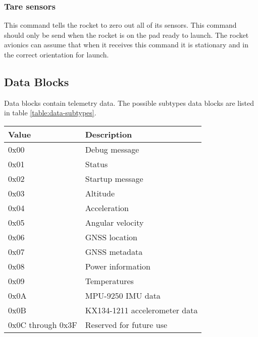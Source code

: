 \subsubsection{Tare sensors}
This command tells the rocket to zero out all of its sensors. This command should only be send when the rocket is on
the pad ready to launch. The rocket avionics can assume that when it receives this command it is stationary and in the
correct orientation for launch.

\subsection{Data Blocks}
Data blocks contain telemetry data. The possible subtypes data blocks are listed in table \ref{table:data-subtypes}.

\begin{table*}[htb]
    \centering
    \begin{tabular}{@{}ll@{}}
        \toprule
        Value             & Description                   \\
        \midrule
        0x00              & Debug message                 \\
        0x01              & Status                        \\
        0x02              & Startup message               \\
        0x03              & Altitude                      \\
        0x04              & Acceleration                  \\
        0x05              & Angular velocity              \\
        0x06              & GNSS location                 \\
        0x07              & GNSS metadata                 \\
        0x08              & Power information             \\
        0x09              & Temperatures                  \\
        0x0A              & MPU-9250 IMU data             \\
        0x0B              & KX134-1211 accelerometer data \\
        0x0C through 0x3F & Reserved for future use       \\
        \bottomrule
    \end{tabular}
    \caption{Data Block Subtypes}
    \label{table:data-subtypes}
\end{table*}

